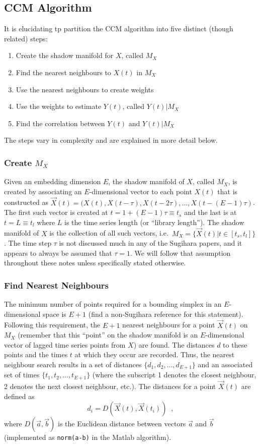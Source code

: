 \documentclass[a4paper,11pt]{article}
\begin{document}
\subsection{CCM Algorithm}
It is elucidating tp partition the CCM algorithm into five distinct (though related) steps:
\begin{enumerate}
\item Create the shadow manifold for $X$, called $M_X$
\item Find the nearest neighbours to $X(t)$ in $M_X$
\item Use the nearest neighbours to create weights
\item Use the weights to estimate $Y(t)$, called $Y(t)|M_X$
\item Find the correlation between $Y(t)$ and $Y(t)|M_X$ 
\end{enumerate}
The steps vary in complexity and are explained in more detail below.

\subsubsection{Create $M_X$}
Given an embedding dimension $E$, the shadow manifold of $X$, called $M_X$, is created by associating an $E$-dimensional vector to each point $X(t)$ that is constructed as $\vec{X}(t)=(X(t),X(t-\tau),X(t-2\tau),\ldots,X(t-(E-1)\tau)$.  The first such vector is created at $t=1+(E-1)\tau\equiv t_s$ and the last is at $t=L\equiv t_l$ where $L$ is the time series length (or ``library length'').  The shadow manifold of $X$ is the collection of all such vectors, i.e.\ $M_X=\{\vec{X}(t) | t\in[t_s,t_l]\}$.  The time step $\tau$ is not discussed much in any of the Sugihara papers, and it appears to always be assumed that $\tau=1$.  We will follow that assumption throughout these notes unless specifically stated otherwise.    

\subsubsection{Find Nearest Neighbours}
The minimum number of points required for a bounding simplex in an $E$-dimensional space is $E+1$ (find a non-Sugihara reference for this statement).  Following this requirement, the $E+1$ nearest neighbours for a point $\vec{X}(t)$ on $M_X$ (remember that this ``point'' on the shadow manifold is an $E$-dimensional vector of lagged time series points from $X$) are found. The distances $d$ to these points and the times $t$ at which they occur are recorded.  Thus, the nearest neighbour search results in a set of distances $\{d_1,d_2,\ldots,d_{E+1}\}$ and an associated set of times $\{t_1,t_2,\ldots,t_{E+1}\}$ (where the subscript 1 denotes the closest neighbour, 2 denotes the next closest neighbour, etc.).  The distances for a point $\vec{X}(t)$ are defined as
$$
d_i = D\left(\vec{X}(t),\vec{X}(t_i)\right)\;\;,
$$
where $D(\vec{a},\vec{b})$ is the Euclidean distance between vectors $\vec{a}$ and $\vec{b}$ (implemented as {\tt norm(a-b)} in the Matlab algorithm).
\end{document}

